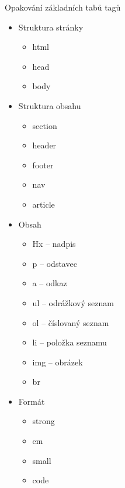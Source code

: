\documentclass{beamer}
\begin{document}
\begin{frame}[shrink]{Opakování základních tabů tagů}
\begin{multicols}{2}

	\begin{itemize}
	\item Struktura stránky
		\begin{itemize}
			\item html
			\item head
			\item body
		\end{itemize}
	\end{itemize}

	\begin{itemize}
		\item Struktura obsahu
		\begin{itemize}
			\item section
			\item header
			\item footer
			\item nav
			\item article 
		\end{itemize}
	\end{itemize}	
	
	\begin{itemize}	
		\item Obsah
		\begin{itemize}
			\item Hx -- nadpis
			\item p -- odstavec
			\item a -- odkaz
			\item ul -- odrážkový seznam
			\item ol -- číslovaný seznam
			\item li -- položka seznamu
			\item img -- obrázek
			\item br
		\end{itemize}
	\end{itemize}

	\begin{itemize}	
		\item Formát
		\begin{itemize}
			\item strong
			\item em
			\item small
			\item code	
		\end{itemize}
	\end{itemize}
	

\end{multicols}
\end{frame}
\end{document}
